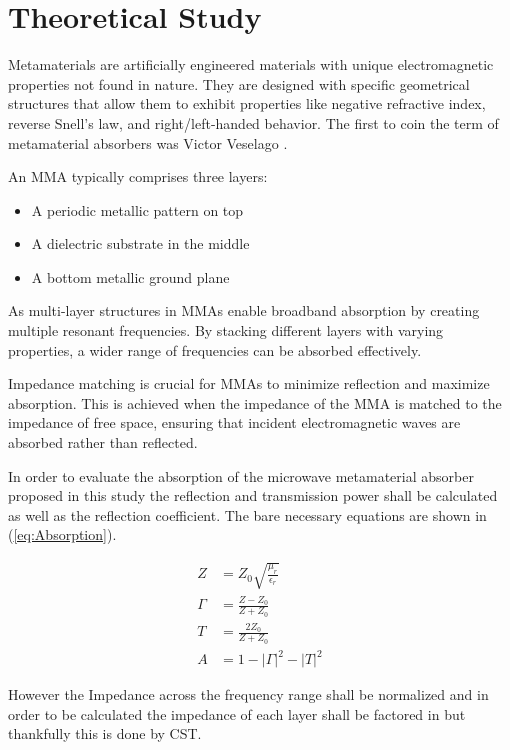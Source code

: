 \section{\textsf{Theoretical Study}}
    Metamaterials are artificially engineered materials with unique electromagnetic properties
    not found in nature. They are designed with specific geometrical structures that allow them
    to exhibit properties like negative refractive index, reverse Snell's law, and right/left-handed
    behavior. The first to coin the term of metamaterial absorbers was Victor Veselago \cite{veselago_left_2006}.
    
    An MMA typically comprises three layers: 
    \begin{itemize}
        \item A periodic metallic pattern on top
        \item A dielectric substrate in the middle
        \item A bottom metallic ground plane
    \end{itemize}
    As multi-layer structures in MMAs enable broadband absorption by creating multiple resonant
    frequencies. By stacking different layers with varying properties, a wider range of 
    frequencies can be absorbed effectively.

    Impedance matching is crucial for MMAs to minimize reflection and maximize absorption. 
    This is achieved when the impedance of the MMA is matched to the impedance of free space,
    ensuring that incident electromagnetic waves are absorbed rather than reflected.

    In order to evaluate the absorption of the microwave metamaterial absorber proposed
    in this study \cite{zhang_design_2023} the reflection and transmission power shall be
    calculated as well as the reflection coefficient. The bare necessary equations are
    shown in (\ref{eq:Absorption}).

    \begin{subequations}
        \label{eq:Absorption}
        \begin{align}
            Z & = Z_0 \sqrt{\frac{\mu_r}{\epsilon_r}} \label{eq:Z} \\
            \Gamma & = \frac{Z - Z_0}{Z + Z_0} \label{eq:ReflectionCoeff} \\
            T & = \frac{2Z_0}{Z + Z_0} \label{eq:TransmissionCoeff} \\
            A & = 1 - |\Gamma|^2 - |T|^2 \label{eq:Absorbance}
        \end{align} 
    \end{subequations}

    However the Impedance across the frequency range shall be normalized and in order to be 
    calculated the impedance of each layer shall be factored in but thankfully this is done
    by CST.
    